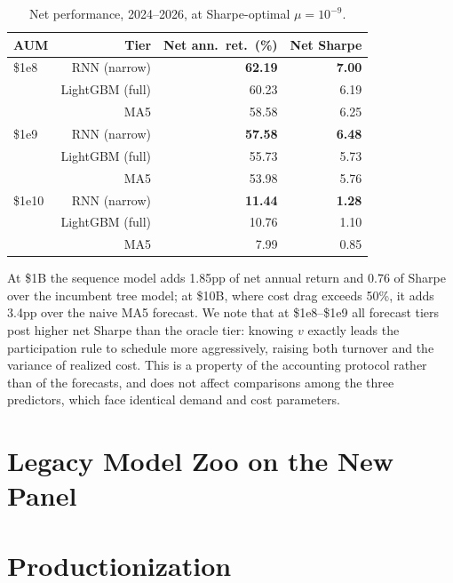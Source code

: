 \documentclass[11pt]{article}
\begin{document}
\begin{table}[h]\centering
\caption{Net performance, 2024--2026, at Sharpe-optimal $\mu=10^{-9}$.}
\label{tab:econ}
\begin{tabular}{lrrr}
\toprule
AUM & Tier & Net ann.\ ret.\ (\%) & Net Sharpe \\
\midrule
\$1e8  & RNN (narrow) & \textbf{62.19} & \textbf{7.00} \\
       & LightGBM (full) & 60.23 & 6.19 \\
       & MA5 & 58.58 & 6.25 \\
\$1e9  & RNN (narrow) & \textbf{57.58} & \textbf{6.48} \\
       & LightGBM (full) & 55.73 & 5.73 \\
       & MA5 & 53.98 & 5.76 \\
\$1e10 & RNN (narrow) & \textbf{11.44} & \textbf{1.28} \\
       & LightGBM (full) & 10.76 & 1.10 \\
       & MA5 & 7.99 & 0.85 \\
\bottomrule
\end{tabular}
\end{table}

At \$1B the sequence model adds 1.85pp of net annual return and 0.76 of Sharpe
over the incumbent tree model; at \$10B, where cost drag exceeds 50\%, it adds
3.4pp over the naive MA5 forecast. We note that at \$1e8--\$1e9 all forecast
tiers post higher net Sharpe than the oracle tier: knowing $v$ exactly leads the
participation rule to schedule more aggressively, raising both turnover and the
variance of realized cost. This is a property of the accounting protocol rather
than of the forecasts, and does not affect comparisons among the three
predictors, which face identical demand and cost parameters.

\section{Legacy Model Zoo on the New Panel}  %

\section{Productionization}          %
\end{document}
